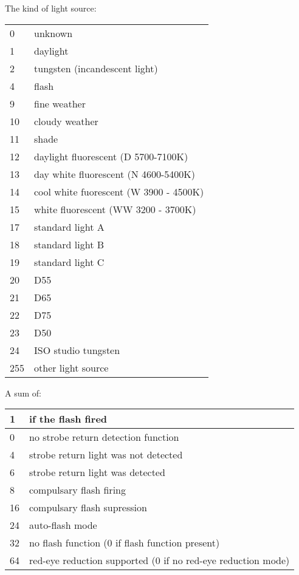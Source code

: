 The kind of light source:

\smallskip

\begin{tabular}{p{0.3in} p{4in}}
0 & unknown \\
1 & daylight \\
2 & tungsten (incandescent light) \\
4 & flash \\
9 & fine weather \\
10 & cloudy weather \\
11 & shade \\
12 & daylight fluorescent (D 5700-7100K) \\
13 & day white fluorescent (N 4600-5400K) \\
14 & cool white fuorescent (W 3900 - 4500K) \\
15 & white fluorescent (WW 3200 - 3700K) \\
17 & standard light A \\
18 & standard light B \\
19 & standard light C \\
20 & D55 \\
21 & D65 \\
22 & D75 \\
23 & D50 \\
24 & ISO studio tungsten \\
255 & other light source
\end{tabular}
\apiend

A sum of:
\smallskip

\begin{tabular}{p{0.3in} p{4in}}
1 & if the flash fired \\
\hline
0 & no strobe return detection function \\
4 & strobe return light was not detected \\
6 & strobe return light was detected \\
\hline
8 & compulsary flash firing \\
16 & compulsary flash supression \\
24 & auto-flash mode \\
\hline 
32 & no flash function (0 if flash function present) \\
\hline
64 & red-eye reduction supported (0 if no red-eye reduction mode) 
\end{tabular}

\apiend

